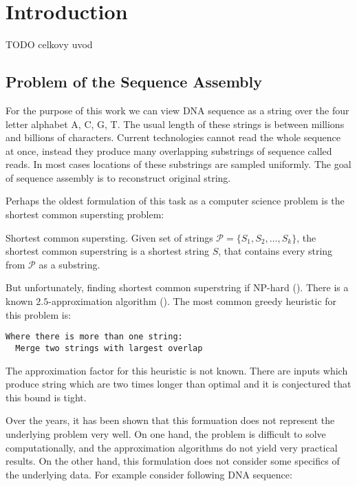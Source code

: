 \chapter{Introduction}

TODO celkovy uvod

\section{Problem of the Sequence Assembly}

For the purpose of this work we can view DNA sequence as a string over the
four letter alphabet A, C, G, T. The usual length of these strings
is between millions and billions of characters.
Current technologies cannot read the whole sequence at once, instead they produce many
overlapping substrings of sequence called reads.
In most cases locations of these substrings are sampled uniformly.
The goal of sequence assembly is to reconstruct original string.

Perhaps the oldest formulation of this task as a computer science
problem is the shortest common supersting problem:

\begin{definition}{Shortest common supersting.}
Given set of strings $\mathcal{P} = \{S_1, S_2, \dots, S_k\}$, the shortest
common superstring is a shortest string $S$, that contains every string
from $\mathcal{P}$ as a substring.
\end{definition}

But unfortunately, finding shortest common superstring if NP-hard (\cite{SCShard}).
There is a known $2.5$-approximation algorithm (\cite{SCSapx}).
The most common greedy heuristic for this problem is:
\begin{verbatim}
Where there is more than one string:
  Merge two strings with largest overlap
\end{verbatim}

The approximation factor for this heuristic is not known. There are inputs
which produce string which are two times longer than optimal
and it is conjectured that this bound is tight.


Over the years, it has been shown
that this formuation does not represent the underlying problem very well.
On one hand, the problem is difficult to solve computationally, and the
approximation algorithms do not yield very practical results.
On the other hand, this formulation does not consider some specifics of the underlying data.
For example consider following DNA sequence:


